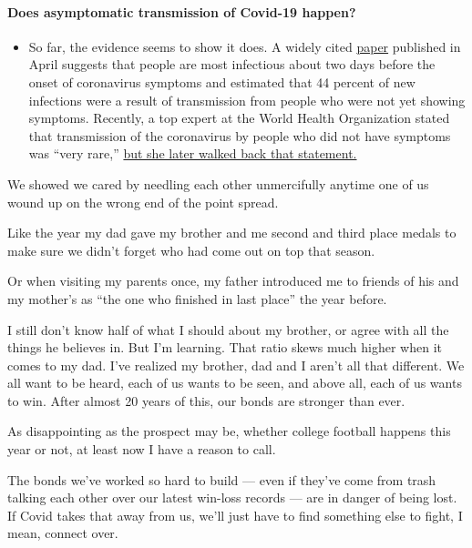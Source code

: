 \begin{itemize}
{  \paragraph{Does asymptomatic transmission of Covid-19
  happen?}\label{does-asymptomatic-transmission-of-covid-19-happen}}

  \begin{itemize}
  \tightlist
  \item
    So far, the evidence seems to show it does. A widely cited
    \href{https://www.nature.com/articles/s41591-020-0869-5}{paper}
    published in April suggests that people are most infectious about
    two days before the onset of coronavirus symptoms and estimated that
    44 percent of new infections were a result of transmission from
    people who were not yet showing symptoms. Recently, a top expert at
    the World Health Organization stated that transmission of the
    coronavirus by people who did not have symptoms was ``very rare,''
    \href{https://www.nytimes.com/2020/06/09/world/coronavirus-updates.html?action=click\&pgtype=Article\&state=default\&region=MAIN_CONTENT_3\&context=storylines_faq\#link-1f302e21}{but
    she later walked back that statement.}
  \end{itemize}
\end{itemize}

We showed we cared by needling each other unmercifully anytime one of us
wound up on the wrong end of the point spread.

Like the year my dad gave my brother and me second and third place
medals to make sure we didn't forget who had come out on top that
season.

Or when visiting my parents once, my father introduced me to friends of
his and my mother's as ``the one who finished in last place'' the year
before.

I still don't know half of what I should about my brother, or agree with
all the things he believes in. But I'm learning. That ratio skews much
higher when it comes to my dad. I've realized my brother, dad and I
aren't all that different. We all want to be heard, each of us wants to
be seen, and above all, each of us wants to win. After almost 20 years
of this, our bonds are stronger than ever.

As disappointing as the prospect may be, whether college football
happens this year or not, at least now I have a reason to call.

The bonds we've worked so hard to build --- even if they've come from
trash talking each other over our latest win-loss records --- are in
danger of being lost. If Covid takes that away from us, we'll just have
to find something else to fight, I mean, connect over.


